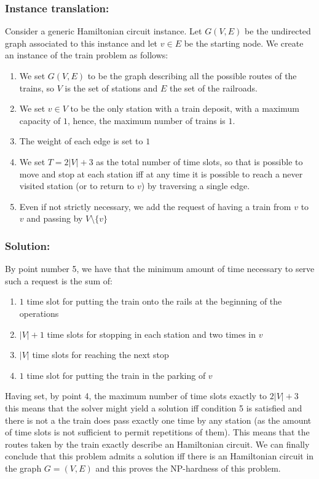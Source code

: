\documentclass[11pt]{article}
\begin{document}
\subsubsection{Instance translation: }

Consider a generic Hamiltonian circuit instance. Let $G(V,E)$ be the undirected graph associated to this instance and 
let $v \in E$ be the starting node. We create an instance of the train problem as follows:

\begin{enumerate}


\item We set $G(V,E)$ to be the graph describing all the possible routes of the trains, so $V$ is the set of stations and $E$ the set of the railroads.
\item We set $v\in V$ to be the only station with a train deposit, with a maximum capacity of $1$, hence, the maximum number of trains is $1$.
\item The weight of each edge is set to $1$
\item We set $T=2|V|+3$ as the total number of time slots, so that is possible to move and stop at each station iff at any time it is possible to reach a never visited station (or to return to $v$) by traversing a single edge.   
\item Even if not strictly necessary, we add the request of having a train from $v$ to $v$ and passing by $V\setminus \{v\}$
\end{enumerate}

\subsubsection{Solution:}

By point number 5, we have that the minimum amount of time necessary to serve such a request is the sum of:
\begin{enumerate}
\item $1$ time slot for putting the train onto the rails at the beginning of the operations
\item $|V|+1$ time slots for stopping in each station and two times in $v$
\item $|V|$ time slots for reaching the next stop 
\item $1$ time slot for putting the train in the parking of $v$
\end{enumerate}
Having set, by point 4, the maximum number of time slots exactly to $2|V|+3$ this means that the solver might yield a solution iff condition 5 is satisfied and there is not a the train does pass exactly one time by any station (as the amount of time slots is not sufficient to permit repetitions of them). This means that the routes taken by the train exactly describe an Hamiltonian circuit.
We can finally conclude that this problem admits a solution iff there is an Hamiltonian circuit in the graph $G=(V,E)$ and this proves the NP-hardness of this problem.
\end{document}
